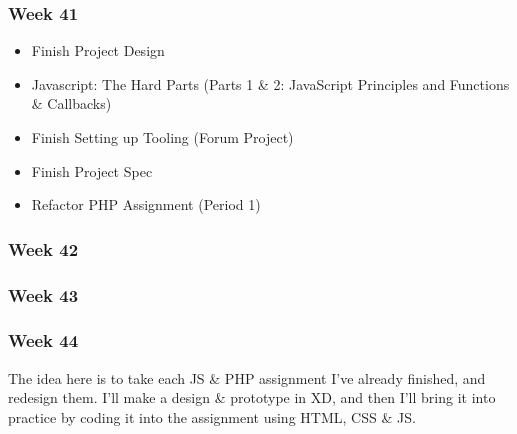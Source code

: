 \subsubsection{Week 41}
\begin{itemize}
  \item{Finish Project Design}
  \item{Javascript: The Hard Parts (Parts 1 & 2: JavaScript Principles and Functions \& Callbacks)}
  \item{Finish Setting up Tooling (Forum Project)} 
  \item{Finish Project Spec} 
  \item{Refactor PHP Assignment (Period 1)}
\end{itemize}

\subsubsection{Week 42}

\subsubsection{Week 43}

\subsubsection{Week 44}

The idea here is to take each JS \& PHP assignment I've already finished, and redesign them.
I'll make a design \& prototype in XD, and then I'll bring it into practice by coding it into 
the assignment using HTML, CSS \& JS.
